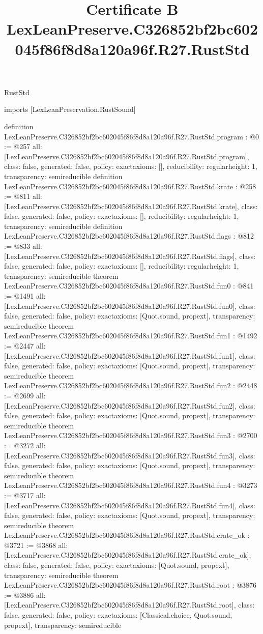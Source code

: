 \begin{lexlean}{RustStd}
\title{Certificate B LexLeanPreserve.C326852bf2bc602045f86f8d8a120a96f.R27.RustStd}
\begin{coremodule}
imports [LexLeanPreservation.RustSound]

definition LexLeanPreserve.C326852bf2bc602045f86f8d8a120a96f.R27.RustStd.program : @0 := @257 {
  all: [LexLeanPreserve.C326852bf2bc602045f86f8d8a120a96f.R27.RustStd.program],
  class: false,
  generated: false,
  policy: exact{axioms: []},
  reducibility: regular{height: 1},
  transparency: semireducible
}
definition LexLeanPreserve.C326852bf2bc602045f86f8d8a120a96f.R27.RustStd.krate : @258 := @811 {
  all: [LexLeanPreserve.C326852bf2bc602045f86f8d8a120a96f.R27.RustStd.krate],
  class: false,
  generated: false,
  policy: exact{axioms: []},
  reducibility: regular{height: 1},
  transparency: semireducible
}
definition LexLeanPreserve.C326852bf2bc602045f86f8d8a120a96f.R27.RustStd.flags : @812 := @833 {
  all: [LexLeanPreserve.C326852bf2bc602045f86f8d8a120a96f.R27.RustStd.flags],
  class: false,
  generated: false,
  policy: exact{axioms: []},
  reducibility: regular{height: 1},
  transparency: semireducible
}
theorem LexLeanPreserve.C326852bf2bc602045f86f8d8a120a96f.R27.RustStd.fun0 : @841 := @1491 {
  all: [LexLeanPreserve.C326852bf2bc602045f86f8d8a120a96f.R27.RustStd.fun0],
  class: false,
  generated: false,
  policy: exact{axioms: [Quot.sound, propext]},
  transparency: semireducible
}
theorem LexLeanPreserve.C326852bf2bc602045f86f8d8a120a96f.R27.RustStd.fun1 : @1492 := @2447 {
  all: [LexLeanPreserve.C326852bf2bc602045f86f8d8a120a96f.R27.RustStd.fun1],
  class: false,
  generated: false,
  policy: exact{axioms: [Quot.sound, propext]},
  transparency: semireducible
}
theorem LexLeanPreserve.C326852bf2bc602045f86f8d8a120a96f.R27.RustStd.fun2 : @2448 := @2699 {
  all: [LexLeanPreserve.C326852bf2bc602045f86f8d8a120a96f.R27.RustStd.fun2],
  class: false,
  generated: false,
  policy: exact{axioms: [Quot.sound, propext]},
  transparency: semireducible
}
theorem LexLeanPreserve.C326852bf2bc602045f86f8d8a120a96f.R27.RustStd.fun3 : @2700 := @3272 {
  all: [LexLeanPreserve.C326852bf2bc602045f86f8d8a120a96f.R27.RustStd.fun3],
  class: false,
  generated: false,
  policy: exact{axioms: [Quot.sound, propext]},
  transparency: semireducible
}
theorem LexLeanPreserve.C326852bf2bc602045f86f8d8a120a96f.R27.RustStd.fun4 : @3273 := @3717 {
  all: [LexLeanPreserve.C326852bf2bc602045f86f8d8a120a96f.R27.RustStd.fun4],
  class: false,
  generated: false,
  policy: exact{axioms: [Quot.sound, propext]},
  transparency: semireducible
}
theorem LexLeanPreserve.C326852bf2bc602045f86f8d8a120a96f.R27.RustStd.crate_ok : @3721 := @3868 {
  all: [LexLeanPreserve.C326852bf2bc602045f86f8d8a120a96f.R27.RustStd.crate_ok],
  class: false,
  generated: false,
  policy: exact{axioms: [Quot.sound, propext]},
  transparency: semireducible
}
theorem LexLeanPreserve.C326852bf2bc602045f86f8d8a120a96f.R27.RustStd.root : @3876 := @3886 {
  all: [LexLeanPreserve.C326852bf2bc602045f86f8d8a120a96f.R27.RustStd.root],
  class: false,
  generated: false,
  policy: exact{axioms: [Classical.choice, Quot.sound, propext]},
  transparency: semireducible
}


\end{coremodule}
\end{lexlean}
